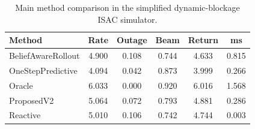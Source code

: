 \begin{table}[t]
\centering
\scriptsize
\setlength{\tabcolsep}{3pt}
\caption{Main method comparison in the simplified dynamic-blockage ISAC simulator.}
\label{tab:main_method}
\begin{tabular}{lccccc}
\toprule
Method & Rate & Outage & Beam & Return & ms \\
\midrule
BeliefAwareRollout & 4.900 & 0.108 & 0.744 & 4.633 & 0.815 \\
OneStepPredictive & 4.094 & 0.042 & 0.873 & 3.999 & 0.266 \\
Oracle & 6.033 & 0.000 & 0.920 & 6.016 & 1.568 \\
ProposedV2 & 5.064 & 0.072 & 0.793 & 4.881 & 0.286 \\
Reactive & 5.010 & 0.106 & 0.742 & 4.744 & 0.003 \\
\bottomrule
\end{tabular}
\end{table}

